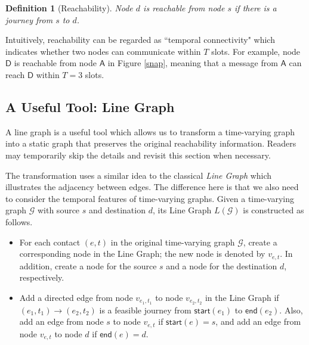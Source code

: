 \documentclass[10pt, conference, letterpaper]{IEEEtran}
\newtheorem{definition}{Definition}
\begin{document}
\begin{definition}[{Reachability}]
Node $d$ is reachable from node $s$ if there is a journey from $s$ to $d$.
\end{definition}

\noindent Intuitively, reachability can be regarded as ``temporal connectivity" which indicates whether two nodes can communicate within $T$ slots. For example, node $\mathsf{D}$ is reachable from node $\mathsf{A}$ in Figure \ref{snap}, meaning that a message from $\mathsf{A}$ can reach $\mathsf{D}$ within $T=3$ slots.

\subsection{A Useful Tool: Line Graph}\label{line}
A line graph is a useful tool which allows us to transform a time-varying graph into a static graph that preserves the original reachability information. Readers may temporarily skip the details and revisit this section when necessary.

The transformation uses a similar idea to the classical \emph{Line Graph} \cite{line_ref} which illustrates the adjacency between edges. The difference here is that we also need to consider the temporal features of time-varying graphs.
Given a time-varying graph $\mathcal{G}$ with source $s$ and destination $d$, its Line Graph $L(\mathcal{G})$ is constructed as follows.

\begin{itemize}[leftmargin=0.3cm,itemsep=1mm,topsep=1mm]
\item {For each contact $(e,t)$ in the original time-varying graph $\mathcal{G}$, create a corresponding node in the Line Graph; the new node is denoted by $v_{e,t}$. In addition, create a node for the source $s$ and a node for the destination $d$, respectively.}

\item {Add a directed edge from node $v_{e_1,t_1}$ to node $v_{e_2,t_2}$ in the Line Graph if $(e_1,t_1)\rightarrow(e_2,t_2)$ is a feasible journey from $\mathsf{start}(e_1)$ to $\mathsf{end}(e_2)$. Also, add an edge from node $s$ to node $v_{e,t}$ if $\mathsf{start}(e)=s$, and add an edge from node $v_{e,t}$ to node $d$ if $\mathsf{end}(e)=d$.}
\end{itemize}
\end{document}
